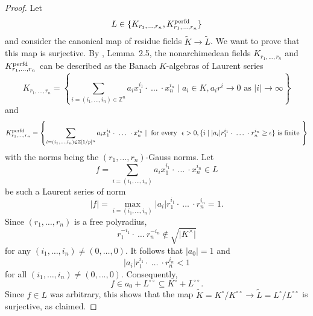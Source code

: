 \begin{proof}Let \begin{equation*}L\in \{K_{r_1,\dots, r_n}, K_{r_1,\dots, r_n}^{\operatorname{perfd}}\}\end{equation*}and consider the canonical map of residue fields $\widetilde{K}\to\widetilde{L}$. We want to prove that this map is surjective. By \cite{Dine-Garzella25}, Lemma~2.5, the nonarchimedean fields $K_{r_1,\dots, r_n}$ and $K_{r_1,\dots, r_n}^{\operatorname{perfd}}$ can be described as the Banach $K$-algebras of Laurent series 
\begin{equation*}K_{r_{1},\dots, r_{n}} = \left\{ \sum_{i=(i_1,\dots, i_{n}) \in \mathbb{Z}^{n}}^{} a_{i}x_{1}^{i_{1}}\cdot~\dots~\cdot x_{n}^{i_{n}} \mid a_{i} \in K, a_{i}r^{i} \xrightarrow{} 0 \text{ as } \vert i\vert
    \xrightarrow{} \infty \right\}\end{equation*}and \begin{equation*}K_{r_1,\dots, r_n}^{\perfd}=\left\{ \sum_{i=(i_1,\dots, i_n) \in \mathbb{Z}[1 / p]^{n}} a_{i}x_{1}^{i_{1}}\cdot~\dots~\cdot x_{n}^{i_{n}} \mid \text{ for every } \epsilon>0, \{i\mid \vert a_{i}\vert r_{1}^{i_{1}}\cdot~\dots~\cdot r_{n}^{i_{n}}\geq\epsilon\} \text{ is finite } \right\}\end{equation*}with the norms being the $(r_1,\dots, r_n)$-Gauss norms. Let \begin{equation*}f=\sum_{i=(i_1,\dots, i_n)} a_{i}x_{1}^{i_{1}}\cdot~\dots~\cdot x_{n}^{i_{n}}\in L\end{equation*}be such a Laurent series of norm \begin{equation*}\vert f\vert=\max_{i=(i_1,\dots, i_n)}\vert a_{i}\vert r_{1}^{i_{1}}\cdot~\dots~\cdot r_{n}^{i_{n}}=1.\end{equation*}Since $(r_1,\dots, r_n)$ is a free polyradius, \begin{equation*}r_{1}^{-i_{1}}\cdot~\dots~r_{n}^{-i_{n}}\not\in \sqrt{\vert K^{\times}\vert}\end{equation*}for any $(i_1,\dots, i_n)\neq (0,\dots, 0)$. It follows that $\vert a_{0}\vert=1$ and \begin{equation*}\vert a_{i}\vert r_{1}^{i_{1}}\cdot~\dots~\cdot r_{n}^{i_{n}}<1\end{equation*}for all $(i_1,\dots, i_n)\neq (0,\dots, 0)$. Consequently, \begin{equation*}f\in a_{0}+L^{\circ\circ}\subseteq K^{\circ}+L^{\circ\circ}.\end{equation*}Since $f\in L$ was arbitrary, this shows that the map $\widetilde{K}=K^{\circ}/K^{\circ\circ}\to \widetilde{L}=L^{\circ}/L^{\circ\circ}$ is surjective, as claimed. \end{proof}
